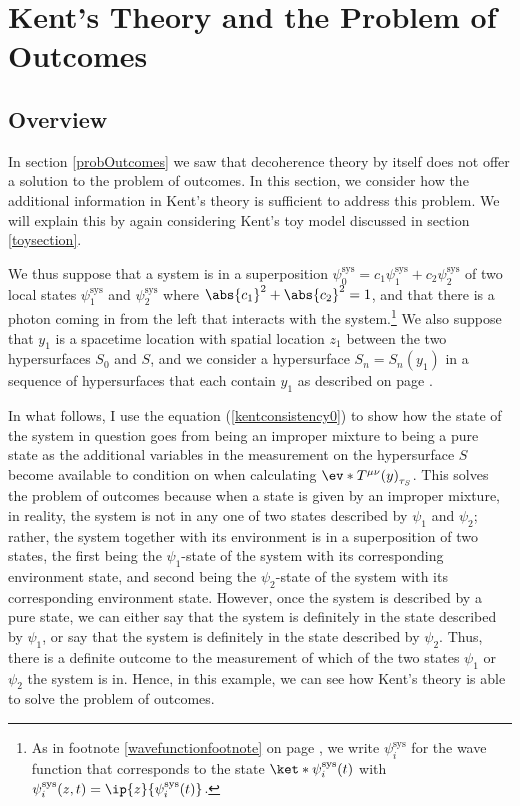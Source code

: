 \documentclass[12pt]{report}
\begin{document}



\section{Kent's Theory\label{Kentdecoherencesection} and the Problem of Outcomes}
\subsection{Overview}
In section \ref{probOutcomes} we saw that decoherence theory by itself does not offer a solution to the problem of outcomes. In this section, we consider how the additional information in Kent's theory is sufficient to address this problem. We will explain this by again considering  Kent's toy model discussed in section \ref{toysection}.

We thus suppose that a system is in a superposition $\psi_0^\text{sys} = c_1\psi_1^\text{sys}+c_2\psi_2^\text{sys}$ of two local states $\psi_1^\text{sys}$ and $\psi_2^\text{sys}$ where $\abs{c_1}^2+\abs{c_2}^2=1$, and that there is a photon coming in from the left that interacts with the system.\footnote{As in footnote \ref{wavefunctionfootnote} on page \pageref{wavefunctionfootnote}, we write $\psi_i^\text{sys}$ for the wave function that corresponds to the state $\ket*{\psi_i^\text{sys}(t)}$ with $\psi_i^\text{sys}(z, t)=\ip{z}{\psi_i^\text{sys}(t)}$.} We also suppose that  $y_1$ is a spacetime location with spatial location $z_1$ between the two hypersurfaces $S_0$ and $S$, and we consider a hypersurface $S_n=S_n(y_1)$  in a sequence of hypersurfaces that each contain $y_1$ as described on page \pageref{siydef}.  

In what follows, I use the equation (\ref{kentconsistency0}) to show how the state of the system in question goes from being an improper mixture  to being a pure state as the additional variables in the measurement on the hypersurface $S$ become available to condition on when calculating $\ev*{T^{\mu\nu}(y)}_{\tau_S}$. This solves the problem of outcomes because when a state is given by an improper mixture, in reality, the system is not in any one of two states described by $\psi_1$ and $\psi_2$; rather, the system together with its environment is in a superposition of two states, the first being the $\psi_1$-state of the system with its corresponding environment state, and second being the $\psi_2$-state of the system with its corresponding environment state.  However, once the system is described by a pure state, we can either say that the system is definitely in the state described by $\psi_1$, or say that the system is definitely in the state described by $\psi_2$. Thus, there is a definite outcome to the measurement of which of the two states $\psi_1$ or $\psi_2$ the system is in. Hence, in this example, we can see how Kent's theory is able to solve the problem of outcomes.    
\end{document}
